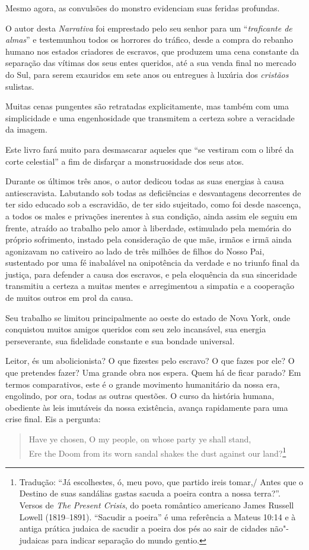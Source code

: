 Mesmo agora, as convulsões do monstro evidenciam suas feridas profundas.

O autor desta \emph{Narrativa} foi emprestado pelo seu senhor para um
``\emph{traficante de almas}'' e testemunhou todos os horrores do
tráfico, desde a compra do rebanho humano nos estados criadores de
escravos, que produzem uma cena constante da separação das vítimas dos
seus entes queridos, até a sua venda final no mercado do Sul, para serem
exauridos em sete anos ou entregues à luxúria dos \emph{cristãos}
sulistas.

Muitas cenas pungentes são retratadas explicitamente, mas também com uma
simplicidade e uma engenhosidade que transmitem a certeza sobre a
veracidade da imagem.

Este livro fará muito para desmascarar aqueles que ``se vestiram com o
libré da corte celestial'' a fim de disfarçar a monstruosidade dos seus
atos.

Durante os últimos três anos, o autor dedicou todas as suas energias à
causa antiescravista. Labutando sob todas as deficiências e desvantagens
decorrentes de ter sido educado sob a escravidão, de ter sido sujeitado,
como foi desde nascença, a todos os males e privações inerentes à sua
condição, ainda assim ele seguiu em frente, atraído ao trabalho pelo
amor à liberdade, estimulado pela memória do próprio sofrimento, instado
pela consideração de que mãe, irmãos e irmã ainda agonizavam no
cativeiro ao lado de três milhões de filhos do Nosso Pai, sustentado por
uma fé inabalável na onipotência da verdade e no triunfo final da
justiça, para defender a causa dos escravos, e pela eloquência da sua
sinceridade transmitiu a certeza a muitas mentes e arregimentou a
simpatia e a cooperação de muitos outros em prol da causa.

Seu trabalho se limitou principalmente ao oeste do estado de Nova York,
onde conquistou muitos amigos queridos com seu zelo incansável, sua
energia perseverante, sua fidelidade constante e sua bondade universal.

Leitor, és um abolicionista? O que fizestes pelo escravo? O que fazes
por ele? O que pretendes fazer? Uma grande obra nos espera. Quem há de
ficar parado? Em termos comparativos, este é o grande movimento
humanitário da nossa era, engolindo, por ora, todas as outras questões.
O curso da história humana, obediente às leis imutáveis da nossa
existência, avança rapidamente para uma crise final. Eis a pergunta:

\begin{verse}
Have ye chosen, O my people, on whose \qb{}party ye shall stand,\\
Ere the Doom from its worn sandal shakes \qb{}the dust against our land?\footnote{Tradução: ``Já escolhestes, ó, meu povo, que partido ireis tomar,/ Antes que o Destino de suas sandálias gastas sacuda a poeira contra a
nossa terra?''. Versos de \emph{The Present Crisis}, do poeta
  romântico americano James Russell Lowell (1819--1891). ``Sacudir a
  poeira'' é uma referência a Mateus 10:14 e à antiga prática judaica de
  sacudir a poeira dos pés ao sair de cidades não"-judaicas para indicar
  separação do mundo gentio.}
\end{verse}

